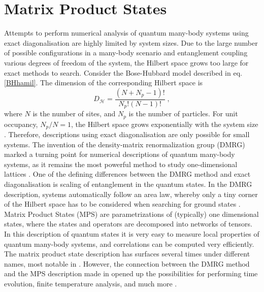 \chapter{Matrix Product States} \label{chap:MPS}
Attempts to perform numerical analysis of quantum many-body systems using exact diagonalisation are highly limited by system sizes. Due to the large number of possible configurations in a many-body scenario and entanglement coupling various degrees of freedom of the system, the Hilbert space grows too large for exact methods to search.
Consider the Bose-Hubbard model described in eq. \eqref{BHhamil}. The dimension of the corresponding Hilbert space is
\begin{equation}
	D_{\mathcal{H}} = \frac{(N+N_p -1)!}{N_p ! (N-1)!} \; ,
\end{equation}
where $N$ is the number of sites, and $N_p$ is the number of particles. For unit occupancy, $N_p / N = 1$, the Hilbert space grows exponentially with the system size \cite{Dong}. Therefore, descriptions using exact diagonalisation are only possible for small systems.
The invention of the density-matrix renormalization group
(DMRG) marked a turning point for numerical descriptions of quantum many-body systems, as it remains the most powerful method to study one-dimensional lattices \cite{White1992,White1993}. One of the defining differences between the DMRG method and exact diagonalisation is scaling of entanglement in the quantum states. In the DMRG description, systems automatically follow an area law, whereby only a tiny corner of the Hilbert space has to be considered when searching for ground states \cite{Cramer}.\\
Matrix Product States (MPS) are parametrizations of (typically) one dimensional states, where the states and operators are decomposed into networks of tensors. In this description of quantum states it is very easy to measure local properties of quantum many-body systems, and correlations can be computed very efficiently. The matrix product state description has surfaces several times under different names, most notable in \cite{Baxter1968}. However, the connection between the DMRG method and the MPS description made in \cite{Ostlund1995, Dukelsky1998} opened up the possibilities for performing time evolution, finite temperature analysis, and much more \cite{schollwock}.



